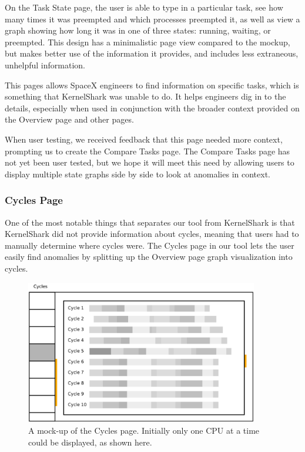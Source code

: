 \documentclass{hmcclinic}
\begin{document}
On the Task State page, the user is able to type in a particular task, see
how many times it was preempted and which processes preempted it, as well as
view a graph showing how long it was in one of three states: running, waiting,
or preempted. This design has a minimalistic page view compared to the mockup,
but makes better use of the information it provides, and includes less
extraneous, unhelpful information.

This pages allows SpaceX engineers to find information on specific tasks, which
is something that KernelShark was unable to do. It helps engineers dig in to the
details, especially when used in conjunction with the broader context provided
on the Overview page and other pages.

When user testing, we received feedback that this page needed more context,
prompting us to create the Compare Tasks page. The Compare Tasks page has not
yet been user tested, but we hope it will meet this need by allowing users to
display multiple state graphs side by side to look at anomalies in context.

\subsubsection{Cycles Page}

One of the most notable things that separates our tool from KernelShark is that
KernelShark did not provide information about cycles, meaning that users had to
manually determine where cycles were.
The Cycles page in our tool lets the user easily find anomalies by splitting up
the Overview page graph visualization into cycles.

\begin{figure}[H]
\begin{center}
\includegraphics[width=4in]{oldcycles.png}
\caption{A mock-up of the Cycles page. Initially only one CPU at a time could be
displayed, as shown here.}
\end{center}
\end{figure}
\end{document}
